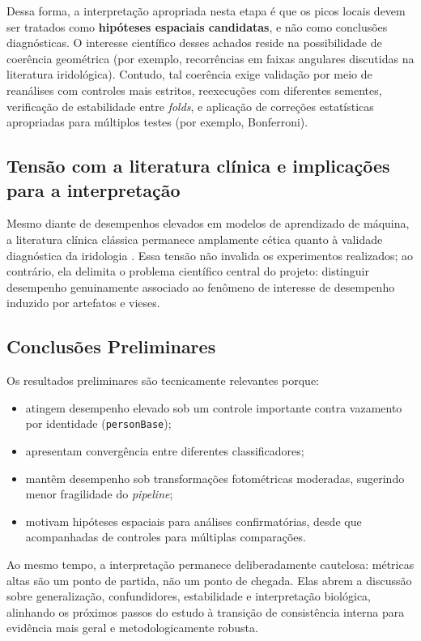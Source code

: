 \documentclass[12pt,a4paper]{article}
\begin{document}
Dessa forma, a interpretação apropriada nesta etapa é que os picos locais devem
ser tratados como \textbf{hipóteses espaciais candidatas}, e não como conclusões
diagnósticas. O interesse científico desses achados reside na possibilidade de
coerência geométrica (por exemplo, recorrências em faixas angulares discutidas na
literatura iridológica). Contudo, tal coerência exige validação por meio de
reanálises com controles mais estritos, reexecuções com diferentes sementes,
verificação de estabilidade entre \textit{folds}, e aplicação de correções
estatísticas apropriadas para múltiplos testes (por exemplo, Bonferroni). %

\subsection{Tensão com a literatura clínica e implicações para a interpretação}
Mesmo diante de desempenhos elevados em modelos de aprendizado de máquina, a
literatura clínica clássica permanece amplamente cética quanto à validade
diagnóstica da iridologia
\citep{Simon1979JAMA, Ernst2000ArchOphthalmol, AusGovIridology2025}.
Essa tensão não invalida os experimentos realizados; ao contrário, ela delimita
o problema científico central do projeto: distinguir desempenho genuinamente
associado ao fenômeno de interesse de desempenho induzido por artefatos e vieses.

\subsection{Conclusões Preliminares}
Os resultados preliminares são tecnicamente relevantes porque:
\begin{itemize}
    \item atingem desempenho elevado sob um controle importante contra vazamento por identidade (\texttt{personBase});
    \item apresentam convergência entre diferentes classificadores;
    \item mantêm desempenho sob transformações fotométricas moderadas, sugerindo menor fragilidade do \textit{pipeline};
    \item motivam hipóteses espaciais para análises confirmatórias, desde que acompanhadas de controles para múltiplas comparações.
\end{itemize}

Ao mesmo tempo, a interpretação permanece deliberadamente cautelosa: métricas
altas são um ponto de partida, não um ponto de chegada. Elas abrem a discussão
sobre generalização, confundidores, estabilidade e interpretação biológica,
alinhando os próximos passos do estudo à transição de consistência interna para
evidência mais geral e metodologicamente robusta.
\end{document}
